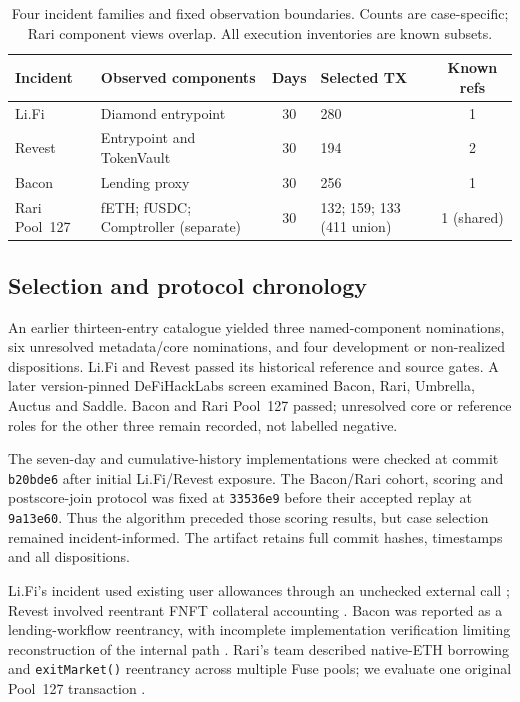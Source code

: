 \documentclass[preprint,12pt,authoryear]{elsarticle}
\begin{document}
\begin{table}[htbp]
\centering\footnotesize
\caption{Four incident families and fixed observation boundaries. Counts are case-specific; Rari component views overlap. All execution inventories are known subsets.}
\label{tab:cohort}
\begin{tabular}{p{1.8cm}p{3.35cm}c p{2.7cm}c}
\toprule
Incident & Observed components & Days & Selected TX & Known refs \\
\midrule
Li.Fi & Diamond entrypoint & 30 & 280 & 1 \\
Revest & Entrypoint and TokenVault & 30 & 194 & 2 \\
Bacon & Lending proxy & 30 & 256 & 1 \\
Rari Pool~127 & fETH; fUSDC; Comptroller (separate) & 30 & 132; 159; 133 (411 union) & 1 (shared) \\
\bottomrule
\end{tabular}
\end{table}

\subsection{Selection and protocol chronology}
An earlier thirteen-entry catalogue yielded three named-component nominations, six unresolved metadata/core nominations, and four development or non-realized dispositions. Li.Fi and Revest passed its historical reference and source gates. A later version-pinned DeFiHackLabs screen examined Bacon, Rari, Umbrella, Auctus and Saddle. Bacon and Rari Pool~127 passed; unresolved core or reference roles for the other three remain recorded, not labelled negative.

The seven-day and cumulative-history implementations were checked at commit \texttt{b20bde6} after initial Li.Fi/Revest exposure. The Bacon/Rari cohort, scoring and postscore-join protocol was fixed at \texttt{33536e9} before their accepted replay at \texttt{9a13e60}. Thus the algorithm preceded those scoring results, but case selection remained incident-informed. The artifact retains full commit hashes, timestamps and all dispositions.

Li.Fi's incident used existing user allowances through an unchecked external call \citep{LiFi2022Postmortem,BlockSec2022LiFi}; Revest involved reentrant FNFT collateral accounting \citep{Revest2022Postmortem,SlowMist2022Revest}. Bacon was reported as a lending-workflow reentrancy, with incomplete implementation verification limiting reconstruction of the internal path \citep{Bacon2022Postmortem,Certik2022Bacon}. Rari's team described native-ETH borrowing and \texttt{exitMarket()} reentrancy across multiple Fuse pools; we evaluate one original Pool~127 transaction \citep{Rari2022Postmortem,Beosin2022Rari}.
\end{document}
